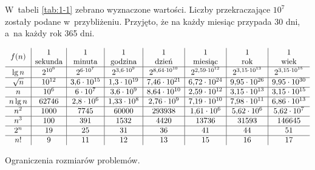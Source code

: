 W~tabeli \ref{tab:1-1} zebrano wyznaczone wartości.
Liczby przekraczające $10^7$ zostały podane w~przybliżeniu.
Przyjęto, że na każdy miesiąc przypada 30 dni, a~na każdy rok 365 dni.

\begin{table}[ht]
	\begin{center}
		\[
			\begin{array}{c|c|c|c|c|c|c|c}
				&1&1&1&1&1&1&1 \\
				\raisebox{1.5ex}[0cm][0cm]{$f(n)$} & \text{sekunda} & \text{minuta} & \text{godzina} & \text{dzień} & \text{miesiąc} & \text{rok} & \text{wiek} \\
				\hline
				\lg n & 2^{10^6} & 2^{6\cdot10^7} & 2^{3{,}6\cdot10^9} & 2^{8{,}64\cdot10^{10}} & 2^{2{,}59\cdot10^{12}} & 2^{3{,}15\cdot10^{13}} & 2^{3{,}15\cdot10^{15}} \\
				\hline
				\sqrt{n} & 10^{12} & 3{,}6\cdot10^{15} & 1{,}3\cdot10^{19} & 7{,}46\cdot10^{21} & 6{,}72\cdot10^{24} & 9{,}95\cdot10^{26} & 9{,}95\cdot10^{30} \\
				\hline
				n & 10^6 & 6\cdot10^7 & 3{,}6\cdot10^9 & 8{,}64\cdot10^{10} & 2{,}59\cdot10^{12} & 3{,}15\cdot10^{13} & 3{,}15\cdot10^{15} \\
				\hline
				n\lg n & 62746 & 2{,}8\cdot10^6 & 1{,}33\cdot10^8 & 2{,}76\cdot10^9 & 7{,}19\cdot10^{10} & 7{,}98\cdot10^{11} & 6{,}86\cdot10^{13} \\
				\hline
				n^2 & 1000 & 7745 & 60000 & 293938 & 1{,}61\cdot10^6 & 5{,}62\cdot10^6 & 5{,}62\cdot10^7 \\
				\hline
				n^3 & 100 & 391 & 1532 & 4420 & 13736 & 31593 & 146645 \\
				\hline
				2^n & 19 & 25 & 31 & 36 & 41 & 44 & 51 \\
				\hline
				n! & 9 & 11 & 12 & 13 & 15 & 16 & 17
			\end{array}
		\]
	\end{center}
	\caption{Ograniczenia rozmiarów problemów.} \label{tab:1-1}
\end{table}
